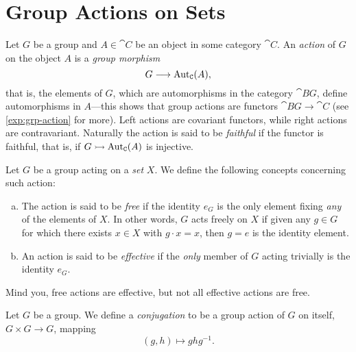 \section{Group Actions on Sets}

\begin{definition}
    \label{def:group-action}
    Let \(G\) be a group and \(A \in \cat C\) be an object in some category
    \(\cat C\). An \emph{action} of \(G\) on the object \(A\) is a \emph{group
        morphism}
    \[
        G \longrightarrow \operatorname{Aut}_{\texttt C}(A),
    \]
    that is, the elements of \(G\), which are automorphisms in the category
    \(\cat{B}G\), define automorphisms in \(A\)---this shows that group actions
    are functors \(\cat{B}G \to \cat C\) (see \cref{exp:grp-action} for more). Left
    actions are covariant functors, while right actions are contravariant.
    Naturally the action is said to be \emph{faithful} if the functor is faithful,
    that is, if \(G \rightarrowtail \operatorname{Aut}_{\texttt C}(A)\) is injective.
\end{definition}

\begin{definition}
    \label{def:free-effective-action}
    Let \(G\) be a group acting on a \emph{set} \(X\). We define the following
    concepts concerning such action:
    \begin{enumerate}[(a)]\setlength\itemsep{0em}
        \item The action is said to be \emph{free} if the identity \(e_G\) is the only
              element fixing \emph{any} of the elements of \(X\). In other words, \(G\) acts
              freely on \(X\) if given any \(g \in G\) for which there exists \(x \in X\)
              with \(g \cdot x = x\), then \(g = e\) is the identity element.

        \item An action is said to be \emph{effective} if the \emph{only} member of
              \(G\) acting trivially is the identity \(e_G\).
    \end{enumerate}
\end{definition}

\begin{remark}
    \label{rem:free-versus-effective-actions}
    Mind you, free actions are effective, but not all effective actions are free.
\end{remark}

\begin{definition}[Conjugation]
    \label{def:group-conjugation-action}
    Let \(G\) be a group. We define a \emph{conjugation} to be a group action of
    \(G\) on itself, \(G \times G \to G\), mapping
    \[
        (g, h) \longmapsto g h g^{-1}.
    \]
\end{definition}

